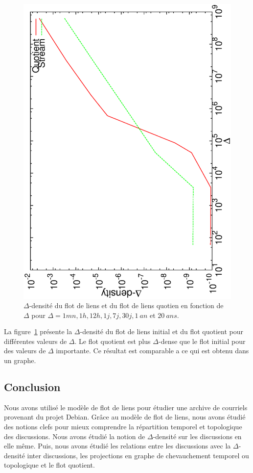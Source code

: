 \begin{figure}
\centering
	\includegraphics[angle=-90, width=0.71\linewidth]{img/mailing/quotient-density}
	\caption{$\Delta$-densité du flot de liens et du flot de liens quotien en fonction de $\Delta$ pour $\Delta=1mn, 1h, 12h, 1j, 7j, 30j, 1\ an$ et $20\ ans$.}
	\label{fig:quotient-stream-density}
\end{figure}

La figure~\ref{fig:quotient-stream-density} présente la $\Delta$-densité du flot de liens initial et du flot quotient pour différentes valeurs de $\Delta$.
Le flot quotient est plus $\Delta$-dense que le flot initial pour des valeurs de $\Delta$ importante.
Ce résultat est comparable a ce qui est obtenu dans un graphe.

\subsection{Conclusion}

Nous avons utilisé le modèle de flot de liens pour étudier une archive de courriels provenant du projet Debian.
Grâce au modèle de flot de liens, nous avons étudié des notions clefs pour mieux comprendre la répartition temporel et topologique des discussions.
Nous avons étudié la notion de $\Delta$-densité sur les discussions en elle même.
Puis, nous avons étudié les relations entre les discussions avec la $\Delta$-densité inter discussions, les projections en graphe de chevauchement temporel ou topologique et le flot quotient.

